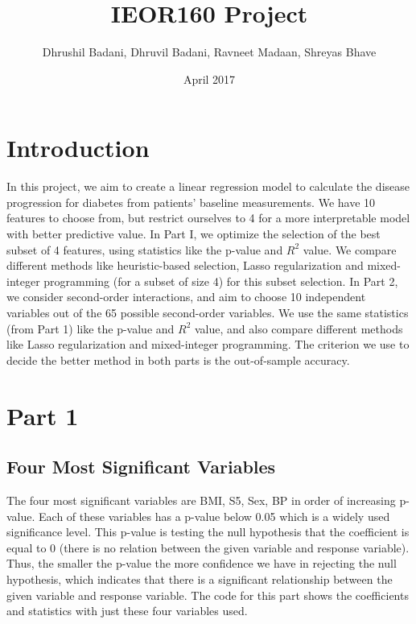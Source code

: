 \documentclass[15pt,a4paper,openright]{article}
\title{IEOR160 Project}
\author{Dhrushil Badani, Dhruvil Badani, Ravneet Madaan, Shreyas Bhave}
\date{April 2017}
\begin{document}
\maketitle

\tableofcontents

\newpage

\section{Introduction}

In this project, we aim to create a linear regression model to calculate the disease progression for diabetes from patients’ baseline measurements. We have 10 features to choose from, but restrict ourselves to 4 for a more interpretable model with better predictive value. In Part I, we optimize the selection of the best subset of 4 features, using statistics like the p-value and $R^2$ value. We compare different methods like heuristic-based selection, Lasso regularization and mixed-integer programming (for a subset of size 4) for this subset selection. In Part 2, we consider second-order interactions, and aim to choose 10 independent variables out of the 65 possible second-order variables. We use the same statistics (from Part 1) like the p-value and $R^2$ value, and also compare different methods like Lasso regularization and mixed-integer programming. The criterion we use to decide the better method in both parts is the out-of-sample accuracy.
 
\section{Part 1}

\vspace{4mm}

\subsection{Four Most Significant Variables}

The four most significant variables are BMI, S5, Sex, BP in order of increasing p-value. Each of these variables has a p-value below 0.05 which is a widely used significance level. This p-value is testing the null hypothesis that the coefficient is equal to 0 (there is no relation between the given variable and response variable). Thus, the smaller the p-value the more confidence we have in rejecting the null hypothesis, which indicates that there is a significant relationship between the given variable and response variable. The code for this part shows the coefficients and statistics with just these four variables used.
\end{document}
